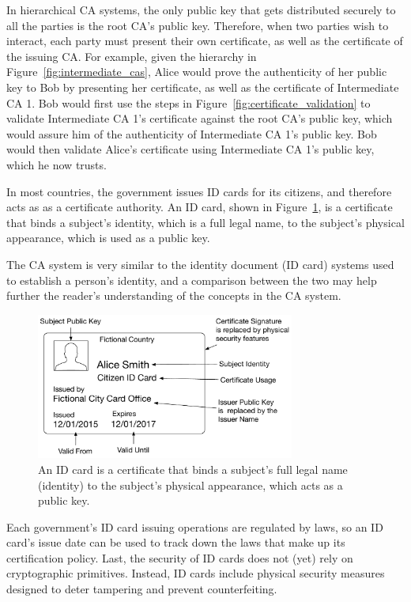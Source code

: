 In hierarchical CA systems, the only public key that gets distributed securely
to all the parties is the root CA's public key. Therefore, when two parties
wish to interact, each party must present their own certificate, as well as the
certificate of the issuing CA. For example, given the hierarchy in
Figure~\ref{fig:intermediate_cas}, Alice would prove the authenticity of her
public key to Bob by presenting her certificate, as well as the certificate of
Intermediate CA 1. Bob would first use the steps in
Figure~\ref{fig:certificate_validation} to validate Intermediate CA 1's
certificate against the root CA's public key, which would assure him of the
authenticity of Intermediate CA 1's public key. Bob would then validate Alice's
certificate using Intermediate CA 1's public key, which he now trusts.

In most countries, the government issues ID cards for its citizens, and
therefore acts as as a certificate authority. An ID card, shown in
Figure~\ref{fig:id_card_as_certificate}, is a certificate that binds a
subject's identity, which is a full legal name, to the subject's physical
appearance, which is used as a public key.

The CA system is very similar to the identity document (ID card) systems used to
establish a person's identity, and a comparison between the two may help further
the reader's understanding of the concepts in the CA system.

\begin{figure}[hbt]
  \centering
  \includegraphics[width=85mm]{figures/id_card_as_certificate.pdf}
  \caption{
    An ID card is a certificate that binds a subject's full legal name
    (identity) to the subject's physical appearance, which acts as a public
    key.
  }
  \label{fig:id_card_as_certificate}
\end{figure}

Each government's ID card issuing operations are regulated by laws, so an ID
card's issue date can be used to track down the laws that make up its
certification policy. Last, the security of ID cards does not (yet) rely on
cryptographic primitives. Instead, ID cards include physical security measures
designed to deter tampering and prevent counterfeiting.


